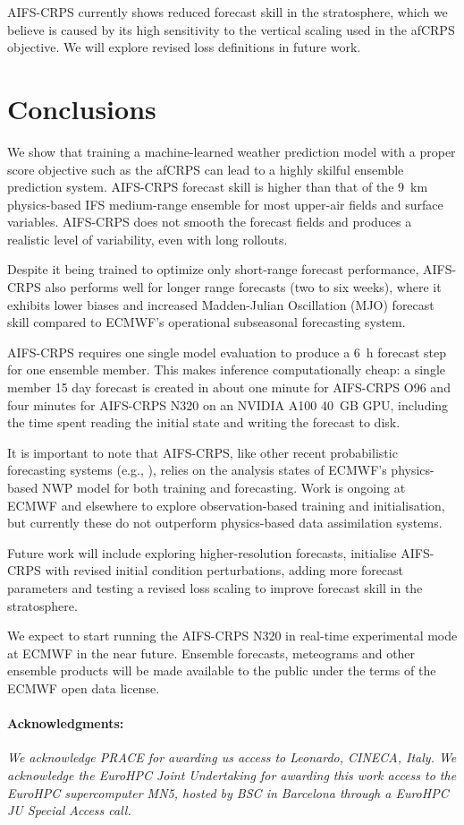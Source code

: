 \documentclass{article}
\begin{document}
AIFS-CRPS currently shows reduced forecast skill in the stratosphere, which we believe is caused by its high sensitivity to the vertical scaling used in the afCRPS objective. We will explore revised loss definitions in future work.

\section{Conclusions}
We show that training a machine-learned weather prediction model with a proper score objective such as the afCRPS can lead to a highly skilful ensemble prediction system. AIFS-CRPS forecast skill is higher than that of the 9~km physics-based IFS medium-range ensemble for most upper-air fields and surface variables. AIFS-CRPS does not smooth the forecast fields and produces a realistic level of variability, even with long rollouts. 

Despite it being trained to optimize only short-range forecast performance, AIFS-CRPS also performs well for longer range forecasts (two to six weeks), where it exhibits lower biases and increased Madden-Julian Oscillation (MJO) forecast skill compared to ECMWF's operational subseasonal forecasting system.

AIFS-CRPS requires one single model evaluation to produce a 6~h forecast step for one ensemble member. This makes inference computationally cheap: a single member 15 day forecast is created in about one minute for AIFS-CRPS O96 and four minutes for AIFS-CRPS N320 on an NVIDIA A100 40~GB GPU, including the time spent reading the initial state and writing the forecast to disk.

It is important to note that AIFS-CRPS, like other recent probabilistic forecasting systems (e.g., \cite{price2023gencast}), relies on the analysis states of ECMWF’s physics-based NWP model for both training and forecasting. Work is ongoing at ECMWF \citep{alexe2024graphdop,mcnally2024ecmwfnl} and elsewhere \citep{vaughan2024aardvark, keller2024ai, manshausen2024generative} to explore observation-based training and initialisation, but currently these do not outperform physics-based data assimilation systems.

Future work will include exploring higher-resolution forecasts, initialise AIFS-CRPS with revised initial condition perturbations, adding more forecast parameters and testing a revised loss scaling to improve forecast skill in the stratosphere.

We expect to start running the AIFS-CRPS N320 in real-time experimental mode at ECMWF in the near future. Ensemble forecasts, meteograms and other ensemble products will be made available to the public under the terms of the ECMWF open data license.

\paragraph{Acknowledgments:} \textit{We acknowledge PRACE for awarding us access to Leonardo, CINECA, Italy. 
We acknowledge the EuroHPC Joint Undertaking for awarding this work access to the EuroHPC supercomputer MN5, hosted by BSC in Barcelona through a EuroHPC JU Special Access call. 
}



\end{document}
